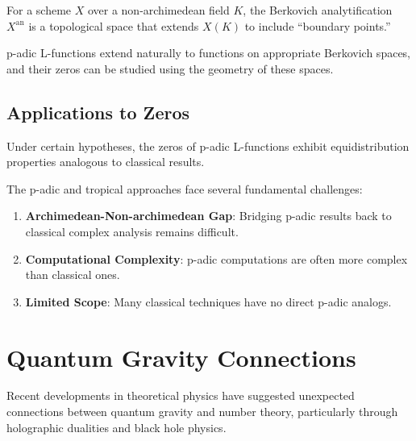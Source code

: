 \begin{definition}
\label{def:berkovich_analytification}
For a scheme $X$ over a non-archimedean field $K$, the Berkovich analytification $X^{\text{an}}$ is a topological space that extends $X(K)$ to include ``boundary points.''
\end{definition}

\begin{theorem}
\label{thm:berkovich_thuillier}
p-adic L-functions extend naturally to functions on appropriate Berkovich spaces, and their zeros can be studied using the geometry of these spaces.
\end{theorem}

\subsection{Applications to Zeros}

\begin{proposition}
\label{prop:padic_zero_distribution}
Under certain hypotheses, the zeros of p-adic L-functions exhibit equidistribution properties analogous to classical results.
\end{proposition}

The p-adic and tropical approaches face several fundamental challenges:

\begin{enumerate}
\item \textbf{Archimedean-Non-archimedean Gap}: Bridging p-adic results back to classical complex analysis remains difficult.

\item \textbf{Computational Complexity}: p-adic computations are often more complex than classical ones.

\item \textbf{Limited Scope}: Many classical techniques have no direct p-adic analogs.
\end{enumerate}

\section{Quantum Gravity Connections}
\label{sec:quantum_gravity}

Recent developments in theoretical physics have suggested unexpected connections between quantum gravity and number theory, particularly through holographic dualities and black hole physics.

